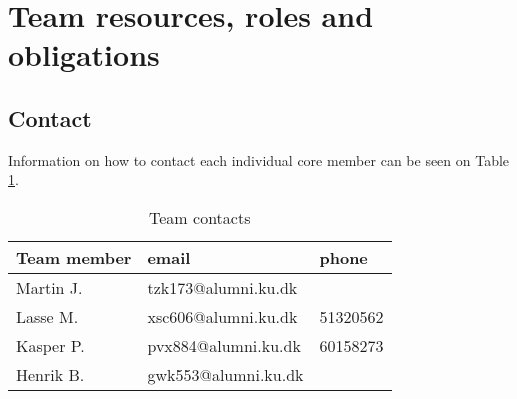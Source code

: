 \section{Team resources, roles and obligations}


\subsection{Contact}
Information on how to contact each individual core member can be seen on Table \ref{tab:contacts}.
\begin{table}[!ht]
    \centering
    \begin{tabular}{l|l|l}
        \rowcolor{Gray}
        \textbf{Team member} & \textbf{email} & \textbf{phone} \\\hline
        Martin J.            & tzk173@alumni.ku.dk & \\
        Lasse M.             & xsc606@alumni.ku.dk & 51320562 \\
        Kasper P.            & pvx884@alumni.ku.dk & 60158273 \\
        Henrik B.            & gwk553@alumni.ku.dk & 
    \end{tabular}
    \caption{Team contacts}
    \label{tab:contacts}
\end{table}

